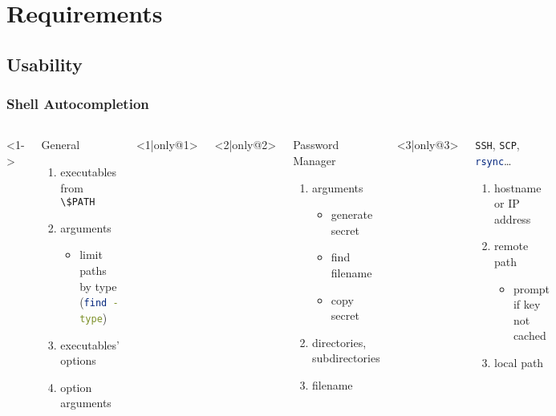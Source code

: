 \documentclass[]{beamer}
\renewcommand{\sh}[1]{\lstinline[columns=fixed,language=sh]{#1}}
\begin{document}
\section{Requirements}
\subsection{Usability}
\begin{frame}
  \frametitle{Shell Autocompletion}
  \begin{columns}
    <1->
    \begin{block}{General}
      \begin{enumerate}
      \item
        executables from \sh{\$PATH}
      \item
        arguments
        \begin{itemize}
        \item
          limit paths by type (\sh{find -type})
        \end{itemize}
      \item
        executables' options
      \item
        option arguments
      \end{enumerate}
    \end{block}
    <1|only@1>

    <2|only@2>
    \begin{block}{Password Manager}
      \begin{enumerate}
      \item
        arguments
        \begin{itemize}
        \item
          generate secret
        \item
          find filename
        \item
          copy secret
        \end{itemize}
      \item
        directories, subdirectories
      \item
        filename
      \end{enumerate}
    \end{block}

    <3|only@3>
    \begin{block}{\sh{SSH}, \sh{SCP}, \sh{rsync}\ldots{}}
      \begin{enumerate}
      \item
        hostname or IP address
      \item
        remote path
        \begin{itemize}
        \item
          prompt if key not cached
        \end{itemize}
      \item
        local path
      \end{enumerate}
    \end{block}
  \end{columns}
\end{frame}
\end{document}
